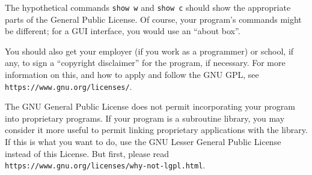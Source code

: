 \documentclass[11pt]{article}
\begin{document}
\begin{enumerate}
The hypothetical commands {\tt show w} and {\tt show c} should show
the appropriate
parts of the General Public License.  Of course, your program's commands
might be different; for a GUI interface, you would use an ``about box''.

You should also get your employer (if you work as a programmer) or
school, if any, to sign a ``copyright disclaimer'' for the program, if
necessary.  For more information on this, and how to apply and follow
the GNU GPL, see \texttt{https://www.gnu.org/licenses/}.

The GNU General Public License does not permit incorporating your
program into proprietary programs.  If your program is a subroutine
library, you may consider it more useful to permit linking proprietary
applications with the library.  If this is what you want to do, use
the GNU Lesser General Public License instead of this License.  But
first, please read \texttt{https://www.gnu.org/licenses/why-not-lgpl.html}.

\end{enumerate}
\end{document}
